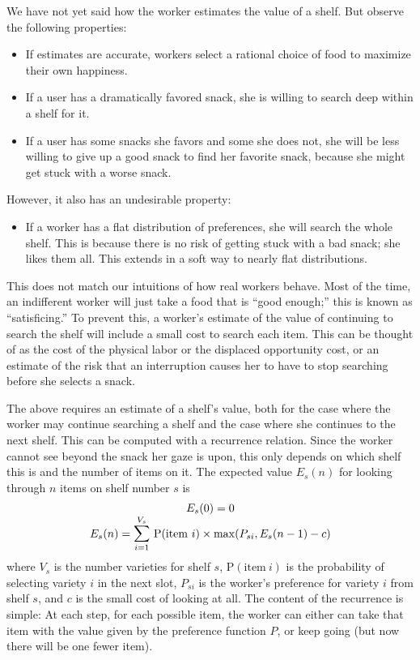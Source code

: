 \documentclass[twocolumn]{article}
\begin{document}
We have not yet said how the worker estimates the value of a shelf. But observe the following properties:

\begin{itemize}
\item If estimates are accurate, workers select a rational choice of food to maximize their own happiness.
\item If a user has a dramatically favored snack, she is willing to search deep within a shelf for it.
\item If a user has some snacks she favors and some she does not, she will be less willing to give up a good snack to find her favorite snack, because she might get stuck with a worse snack.
\end{itemize}

However, it also has an undesirable property:

\begin{itemize}
\item If a worker has a flat distribution of preferences, she will search the whole shelf. This is because there is no risk of getting stuck with a bad snack; she likes them all. This extends in a soft way to nearly flat distributions.
\end{itemize}

This does not match our intuitions of how real workers behave. Most of the time, an indifferent worker will just take a food that is ``good enough;'' this is known as ``satisficing.''\cite{simon1956rational} To prevent this, a worker's estimate of the value of continuing to search the shelf will include a small cost to search each item. This can be thought of as the cost of the physical labor or the displaced opportunity cost, or an estimate of the risk that an interruption causes her to have to stop searching before she selects a snack.

\medskip
The above requires an estimate of a shelf's value, both for the case where the worker may continue searching a shelf and the case where she continues to the next shelf. This can be computed with a recurrence relation. Since the worker cannot see beyond the snack her gaze is upon, this only depends on which shelf this is and the number of items on it. The expected value $E_s(n)$ for looking through $n$ items on shelf number $s$ is
%
$$
\begin{array}{c}
E_s(0) = 0 \\
E_s(n) = \mathlarger{\mathlarger{\sum}}_{i=1}^{V_s}\ \mathrm{P}(\mathrm{item}\ i) \times \mathrm{max}(P_{si}, E_s(n - 1) - c)
\end{array}
$$
%
where $V_s$ is the number varieties for shelf $s$, $\mathrm{P}(\mathrm{item}\ i)$ is the probability of selecting variety $i$ in the next slot, $P_{si}$ is the worker's preference for variety $i$ from shelf $s$, and $c$ is the small cost of looking at all. The content of the recurrence is simple: At each step, for each possible item, the worker can either can take that item with the value given by the preference function $P$, or keep going (but now there will be one fewer item).
\end{document}
